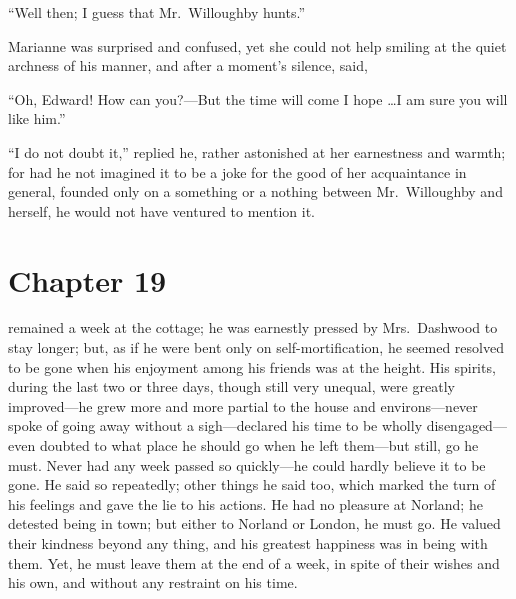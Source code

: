 ``Well then; I guess that Mr.\ Willoughby hunts.''

Marianne was surprised and confused, yet she could
not help smiling at the quiet archness of his manner,
and after a moment's silence, said,

``Oh, Edward! How can you?---But the time will come
I hope \ldots I am sure you will like him.''

``I do not doubt it,'' replied he, rather astonished
at her earnestness and warmth; for had he not imagined it
to be a joke for the good of her acquaintance in general,
founded only on a something or a nothing between Mr.\ Willoughby
and herself, he would not have ventured to mention it.



\chapter{Chapter 19}


 remained a week at the cottage; he was earnestly
pressed by Mrs.\ Dashwood to stay longer; but, as if he
were bent only on self-mortification, he seemed resolved
to be gone when his enjoyment among his friends was at
the height.  His spirits, during the last two or three days,
though still very unequal, were greatly improved---he grew
more and more partial to the house and environs---never
spoke of going away without a sigh---declared his time
to be wholly disengaged---even doubted to what place he
should go when he left them---but still, go he must.
Never had any week passed so quickly---he could hardly
believe it to be gone.  He said so repeatedly; other things
he said too, which marked the turn of his feelings and gave
the lie to his actions.  He had no pleasure at Norland;
he detested being in town; but either to Norland or London,
he must go.  He valued their kindness beyond any thing,
and his greatest happiness was in being with them.
Yet, he must leave them at the end of a week, in spite
of their wishes and his own, and without any restraint
on his time.

